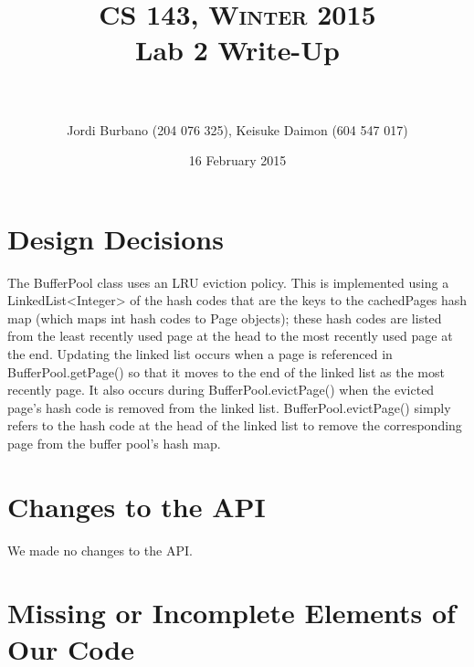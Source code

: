 \documentclass[paper=a4, fontsize=11pt]{scrartcl} %
\title{	
\normalfont \normalsize \textsc{CS 143, Winter 2015}
\horrule{0.5pt} \\[0.4cm] %
\huge Lab 2 Write-Up \\ %
\horrule{2pt} \\[0.5cm] %
}
\author{Jordi Burbano (204 076 325), Keisuke Daimon (604 547 017)} %
\date{\normalsize 16 February 2015} %
\numberwithin{equation}{section} %
\numberwithin{figure}{section} %
\numberwithin{table}{section} %
\begin{document}
\maketitle %


\section{Design Decisions}

The BufferPool class uses an LRU eviction policy. This is implemented using a LinkedList<Integer> of the hash codes that are the keys to the cachedPages hash map (which maps int hash codes to Page objects); these hash codes are listed from the least recently used page at the head to the most recently used page at the end. Updating the linked list occurs when a page is referenced in BufferPool.getPage() so that it moves to the end of the linked list as the most recently page. It also occurs during BufferPool.evictPage() when the evicted page's hash code is removed from the linked list. BufferPool.evictPage() simply refers to the hash code at the head of the linked list to remove the corresponding page from the buffer pool's hash map.




\section{Changes to the API}

We made no changes to the API.




\section{Missing or Incomplete Elements of Our Code}
\end{document}

